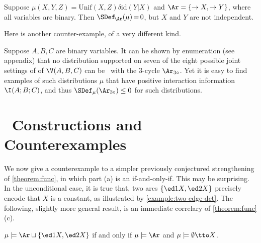 \begin{subappendices}
\begin{example}
    Suppose $\mu(X,Y,Z) = \mathrm{Unif}(X,Z) \delta \mathrm{id} (Y|X)$ and $\Ar = \{\to X, \to Y\}$,
    where all variables are binary.
    Then $\SDef_{\!\Ar}(\mu) \,{=}\, 0$, but $X$ and $Y$ are not independent.
    \qedhere
\end{example}
Here is another counter-example, of a very different kind.
\begin{example}
    Suppose  $A, B, C$ are binary variables.
    It can be shown by enumeration (see appendix) that
    no distribution supported on seven of the eight
    possible joint settings of of $\V(A,B,C)$ can be
    \scible\ with the 3-cycle $\Ar_{3\circ}$. Yet it is easy
    to find examples of such distributions $\mu$ that have positive
    interaction information $\I(A;B;C)$,
    and thus $\SDef_{\mu}(\Ar_{3\circ}) \le 0$ for such distributions.
\end{example}


\section{\SCibility\ Constructions and Counterexamples}
    \label{sec:func-counterexamples}

We now give a counterexample to a 
simpler previously conjectured strengthening of \cref{theorem:func},
in which part (a) is an if-and-only-if. 
This may be surprising.
In the unconditional case, it is true that, two arcs $\{ \ed1{}X, \ed2{}X \}$ precisely encode that $X$ is a constant, as illustrated by \cref{example:two-edge-det}.
The following, slightly more general result, 
    is an immediate correlary of \cref{theorem:func}(c).

\begin{prop}
    $\mu \models \Ar \sqcup \{ \ed1{}X, \ed2{}X \}$ if and only if $\mu \models \Ar$ and
    $\mu \models \emptyset \tto X$. 
\end{prop}


\end{subappendices}
